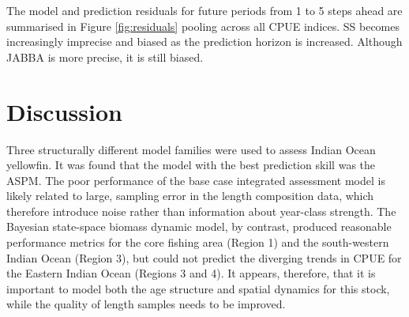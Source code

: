 \documentclass[12pt,halfline,a4paper,nonumbib]{ouparticle}
\begin{document}

The model and prediction residuals for future periods from 1 to 5 steps ahead are summarised in Figure \ref{fig:residuals} pooling across all CPUE indices. SS becomes increasingly imprecise and biased as the prediction horizon is increased. Although JABBA is more precise, it is still biased.

\section{Discussion}

Three structurally different model families were used to assess Indian Ocean yellowfin. It was found that the model with the best prediction skill was the ASPM. The poor performance of the base case integrated assessment model is likely related to large, sampling error in the length composition data, which therefore introduce noise rather than information about year-class strength. The Bayesian state-space biomass dynamic model, by contrast, produced reasonable performance metrics for the core fishing area (Region 1) and the south-western Indian Ocean (Region 3), but could not predict the diverging trends in CPUE for the Eastern Indian Ocean (Regions 3 and 4). It appears, therefore, that it is important to model both the age structure and spatial dynamics for this stock, while the quality of length samples needs to be improved. 
\end{document}
